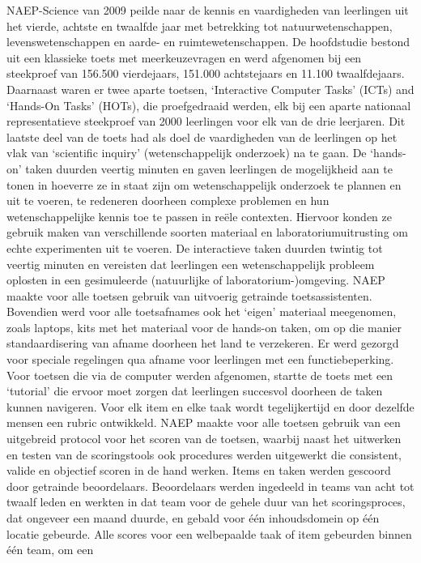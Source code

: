 \documentclass[
  letterpaper,
]{report}
\begin{document}
NAEP-Science van 2009 peilde naar de kennis en vaardigheden van
leerlingen uit het vierde, achtste en twaalfde jaar met betrekking tot
natuurwetenschappen, levenswetenschappen en aarde- en
ruimtewetenschappen. De hoofdstudie bestond uit een klassieke toets met
meerkeuzevragen en werd afgenomen bij een steekproef van 156.500
vierdejaars, 151.000 achtstejaars en 11.100 twaalfdejaars. Daarnaast
waren er twee aparte toetsen, `Interactive Computer Tasks' (ICTs) and
`Hands-On Tasks' (HOTs), die proefgedraaid werden, elk bij een aparte
nationaal representatieve steekproef van 2000 leerlingen voor elk van de
drie leerjaren. Dit laatste deel van de toets had als doel de
vaardigheden van de leerlingen op het vlak van `scientific inquiry'
(wetenschappelijk onderzoek) na te gaan. De `hands-on' taken duurden
veertig minuten en gaven leerlingen de mogelijkheid aan te tonen in
hoeverre ze in staat zijn om wetenschappelijk onderzoek te plannen en
uit te voeren, te redeneren doorheen complexe problemen en hun
wetenschappelijke kennis toe te passen in reële contexten. Hiervoor
konden ze gebruik maken van verschillende soorten materiaal en
laboratoriumuitrusting om echte experimenten uit te voeren. De
interactieve taken duurden twintig tot veertig minuten en vereisten dat
leerlingen een wetenschappelijk probleem oplosten in een gesimuleerde
(natuurlijke of laboratorium-)omgeving. NAEP maakte voor alle toetsen
gebruik van uitvoerig getrainde toetsassistenten. Bovendien werd voor
alle toetsafnames ook het `eigen' materiaal meegenomen, zoals laptops,
kits met het materiaal voor de hands-on taken, om op die manier
standaardisering van afname doorheen het land te verzekeren. Er werd
gezorgd voor speciale regelingen qua afname voor leerlingen met een
functiebeperking. Voor toetsen die via de computer werden afgenomen,
startte de toets met een `tutorial' die ervoor moet zorgen dat
leerlingen succesvol doorheen de taken kunnen navigeren. Voor elk item
en elke taak wordt tegelijkertijd en door dezelfde mensen een rubric
ontwikkeld. NAEP maakte voor alle toetsen gebruik van een uitgebreid
protocol voor het scoren van de toetsen, waarbij naast het uitwerken en
testen van de scoringstools ook procedures werden uitgewerkt die
consistent, valide en objectief scoren in de hand werken. Items en taken
werden gescoord door getrainde beoordelaars. Beoordelaars werden
ingedeeld in teams van acht tot twaalf leden en werkten in dat team voor
de gehele duur van het scoringsproces, dat ongeveer een maand duurde, en
gebald voor één inhoudsdomein op één locatie gebeurde. Alle scores voor
een welbepaalde taak of item gebeurden binnen één team, om een
\end{document}
